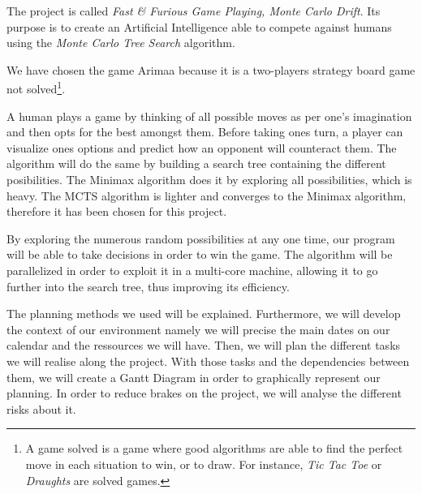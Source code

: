 The project is called \emph{Fast \& Furious Game Playing, Monte Carlo Drift}. Its purpose is to create an Artificial Intelligence able to compete against humans using the \emph{Monte Carlo Tree Search} algorithm.

We have chosen the game Arimaa because it is a two-players strategy board game not solved\footnote{A game solved is a game where good algorithms are able to find the perfect move in each situation to win, or to draw. For instance, \textit{Tic Tac Toe} or \textit{Draughts} are solved games.}.

A human plays a game by thinking of all possible moves as per one's imagination and then opts for the best amongst them. Before taking ones turn, a player can visualize ones options and predict how an opponent will counteract them. The algorithm will do the same by building a search tree containing the different posibilities. The Minimax algorithm does it by exploring all possibilities, which is heavy. The MCTS algorithm is lighter and converges to the Minimax algorithm, therefore it has been chosen for this project.

By exploring the numerous random possibilities at any one time, our program will be able to take decisions in order to win the game.
The algorithm will be parallelized in order to exploit it in a multi-core machine, allowing it to go further into the search tree, thus improving its efficiency.

The planning methods we used will be explained. Furthermore, we will develop the context of our environment namely we will precise the main dates on our calendar and the ressources we will have.  Then, we will plan the different tasks we will realise along the project. With those tasks and the dependencies between them, we will create a Gantt Diagram in order to graphically represent our planning. In order to reduce brakes on the project, we will analyse the different risks about it.
